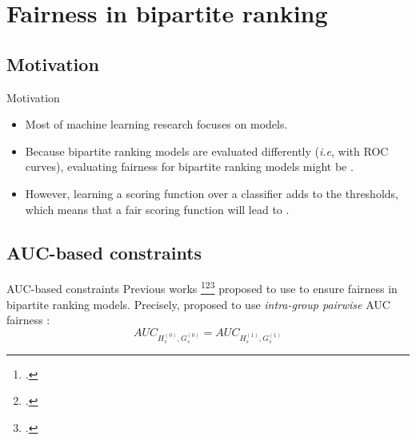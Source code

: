 \section{Fairness in bipartite ranking}

\subsection{Motivation}
\begin{frame}{Motivation}
    \begin{itemize}
        \item Most of  machine learning research focuses on  models.
        \item Because bipartite ranking models are evaluated differently (\textit{i.e}, with ROC curves), evaluating fairness for bipartite ranking models might be .        
        \item However, learning a scoring function over a classifier adds  to the thresholds, which means that a fair scoring function will lead to .
    \end{itemize}
\end{frame}


\subsection{AUC-based constraints}
\begin{frame}{AUC-based constraints}
    Previous works \footcite{kallus2019fairness}\footcite{beutel2019fairness}\footcite{borkan2019nuanced} proposed to use  to ensure fairness in bipartite ranking models. Precisely, \cite{kallus2019fairness} proposed to use \textit{intra-group pairwise} AUC fairness :
    \begin{equation}
        AUC_{H_s^(0),G_s^(0)} = AUC_{H_s^(1),G_s^(1)}
    \end{equation}

\end{frame}

